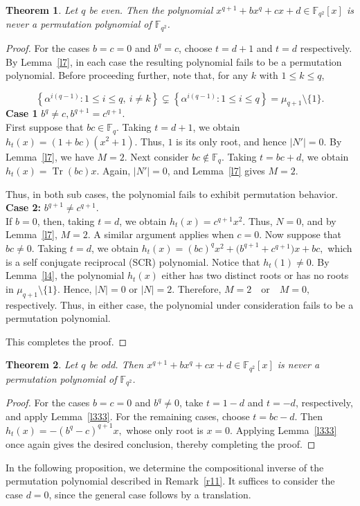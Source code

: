\documentclass[12pt]{amsart}
\newtheorem{theorem}{Theorem}[section]
\theoremstyle{definition}
\theoremstyle{remark}
\numberwithin{equation}{section}
\begin{document}
\begin{theorem}\label{p3.8}
Let $q$ be even. Then the polynomial
$
x^{q+1}+bx^q+cx+d \in \mathbb{F}_{q^2}[x]
$
is never a permutation polynomial of $\mathbb{F}_{q^2}$.
\end{theorem}
\begin{proof}
For the cases $b=c=0$ and $b^q=c$, choose $t=d+1$ and $t=d$ respectively. By Lemma~\ref{l7}, in each case the resulting polynomial fails to be a permutation polynomial.
Before proceeding further, note that, for any $k$ with $1\leq k\leq q$,

$$
\left\{
\alpha^{i(q-1)}:1\leq i\leq q,\ i\neq k
\right\}
\subsetneq
\left\{
\alpha^{i(q-1)}:1\leq i\leq q
\right\}
=\mu_{q+1}\setminus\{1\}.
$$
\textbf{Case 1} $
b^q\neq c,b^{q+1}=c^{q+1}$.\\
First suppose that $bc\in\mathbb{F}_q$. Taking $t=d+1$, we obtain $h_t(x)=(1+bc)(x^2+1).
$ Thus, $1$ is its only root, and hence $|N'|=0$. By Lemma~\ref{l7}, we have $M=2$. 
Next consider $bc\notin\mathbb{F}_q$. Taking $t=bc+d$, we obtain $
h_t(x)=\operatorname{Tr}(bc)x.
$ Again, $|N'|=0$, and Lemma~\ref{l7} gives $
M=2.
$

Thus, in both sub cases, the polynomial fails to exhibit permutation behavior.\\
\textbf{Case 2:} $
b^{q+1}\neq c^{q+1}.
$\\
If $b=0$, then, taking $t=d$, we obtain $
h_t(x)=c^{q+1}x^2.
$ Thus, $N=0$, and by Lemma~\ref{l7}, $M=2.
$ A similar argument applies when $c=0$. 
Now suppose that $bc\neq0$. Taking $t=d$, we obtain $h_t(x)
=(bc)^qx^2+
\bigl(b^{q+1}+c^{q+1}\bigr)x+bc,
$ which is a self conjugate reciprocal (SCR) polynomial. Notice that $
h_t(1)\neq0.
$ By Lemma~\ref{l4}, the polynomial $h_t(x)$ either has two distinct roots
or has no roots in $\mu_{q+1}\setminus \{1\}$. Hence, $
|N|=0$ or $|N|=2.$ Therefore, $M=2\quad\text{or}\quad M=0,
$ respectively. Thus, in either case, the polynomial under consideration
fails to be a permutation polynomial.

This completes the proof.
\end{proof}
\begin{theorem}
Let $q$ be odd. Then
$
x^{q+1}+bx^q+cx+d \in \mathbb{F}_{q^2}[x]
$
is never a permutation polynomial of $\mathbb{F}_{q^2}$.
\end{theorem}
\begin{proof}
For the cases $b=c=0$ and $b^q\neq0$, take $t=1-d$ and $t=-d$, respectively, and apply Lemma~\ref{l333}. For the remaining cases, choose $
t=bc-d.
$ Then $
h_t(x)=-(b^q-c)^{q+1}x,
$ whose only root is $x=0$. Applying Lemma~\ref{l333} once again gives the desired conclusion, thereby completing the proof.
\end{proof}
In the following proposition, we determine the compositional inverse of the permutation polynomial described in Remark~\ref{r11}. It suffices to consider the case $d=0$, since the general case follows by a translation.
\end{document}
